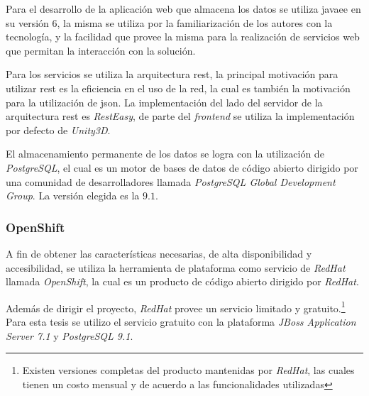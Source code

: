 Para el desarrollo de la aplicación web que almacena los datos se utiliza
\Gls{javaee} en su versión $6$, la misma se utiliza por la familiarización de
los autores con la tecnología, y la facilidad que provee la misma para la
realización de servicios web que permitan la interacción con la solución.

Para los servicios se utiliza la arquitectura \Gls{rest}, la principal
motivación para utilizar \Gls{rest} es la eficiencia en el uso de la
red\cite{pautasso2008restful}, la cual es también la motivación para la
utilización de \Gls{json}. La implementación del lado del servidor de la
arquitectura \Gls{rest} es \textit{RestEasy}, de parte del \textit{frontend} se utiliza
la implementación por defecto de \textit{Unity3D}.

El almacenamiento permanente de los datos se logra con la utilización de
\textit{PostgreSQL}, el cual es un motor de bases de datos de código abierto
dirigido por una comunidad de desarrolladores llamada \textit{PostgreSQL Global
    Development Group}. La versión elegida es la $9.1$.

\subsubsection{OpenShift}

A fin de obtener las características necesarias, de alta disponibilidad y
accesibilidad, se utiliza la herramienta de plataforma como servicio de
\textit{RedHat} llamada \textit{OpenShift}, la cual es un producto de código
abierto dirigido por \textit{RedHat}.

Además de dirigir el proyecto, \textit{RedHat} provee un servicio limitado y
gratuito\cite{openshift:pricing}.\footnote{Existen versiones completas del
    producto mantenidas por \textit{RedHat}, las cuales tienen un costo mensual
    y de acuerdo a las funcionalidades utilizadas\cite{openshift:pricing}} Para
esta tesis se utilizo el servicio gratuito con la plataforma \textit{JBoss
    Application Server 7.1} y \textit{PostgreSQL 9.1}.
